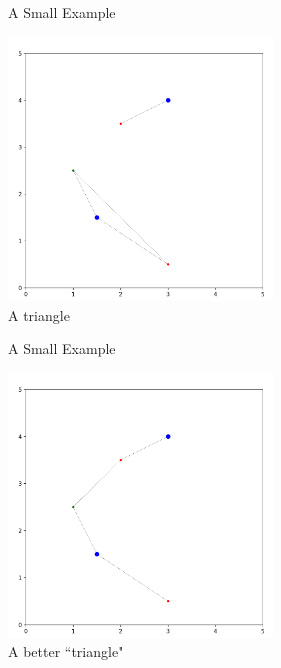 \documentclass{beamer}
\begin{document}
\begin{frame}{A Small Example}
	\begin{center}
	\includegraphics[width=7cm]{small_ex_ok.png}\\
	A triangle
	\end{center}
\end{frame}

\begin{frame}{A Small Example}
	\begin{center}
	\includegraphics[width=7cm]{small_ex_best.png}\\
	A better ``triangle"
	\end{center}
\end{frame}
\end{document}
